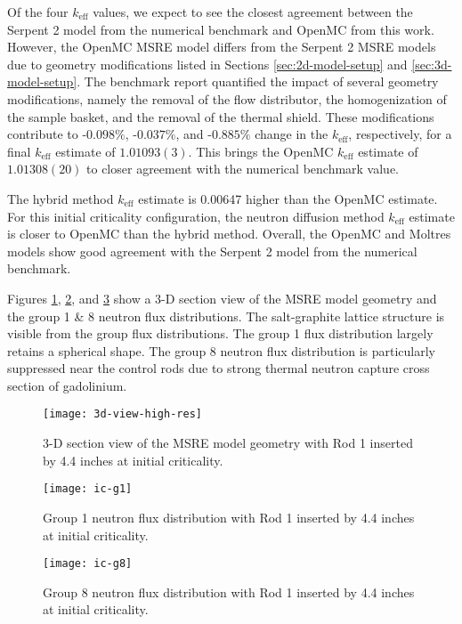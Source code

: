 Of the four $k_\text{eff}$ values, we expect to see the closest agreement between the Serpent 2
model from the numerical benchmark and OpenMC from this work. However, the OpenMC \gls{MSRE} model
differs from the Serpent 2 \gls{MSRE} models due to geometry modifications listed in Sections
\ref{sec:2d-model-setup} and \ref{sec:3d-model-setup}. The benchmark report quantified the impact
of several geometry modifications, namely the removal of the flow distributor, the homogenization
of the sample basket, and the removal of the thermal shield. These modifications contribute to
-$0.098\%$, -$0.037\%$, and -$0.885\%$ change in the $k_\text{eff}$, respectively, for a final
$k_\text{eff}$ estimate of $1.01093(3)$. This brings the OpenMC $k_\text{eff}$ estimate of
$1.01308(20)$ to closer agreement with the numerical benchmark value.

The hybrid method $k_\text{eff}$ estimate is 0.00647 higher than the OpenMC estimate. For this
initial criticality configuration, the neutron diffusion method $k_\text{eff}$ estimate is closer
to OpenMC than the hybrid method. Overall, the OpenMC and Moltres models show good agreement with
the Serpent 2 model from the numerical benchmark.

Figures \ref{fig:3d-view}, \ref{fig:ic-g1}, and \ref{fig:ic-g8} show a 3-D section view of the
\gls{MSRE} model geometry and the group 1 \& 8 neutron
flux distributions. The salt-graphite lattice structure is visible from the group flux
distributions. The group 1 flux distribution largely retains a spherical shape. The group 8 neutron
flux distribution is particularly suppressed near the control rods due to strong thermal neutron
capture cross section of gadolinium.

\begin{figure}[p]
  \centering
  \texttt{[image: 3d-view-high-res]}
  \caption{3-D section view of the \gls{MSRE} model geometry with Rod 1 inserted by 4.4 inches at
  initial criticality.}
  \label{fig:3d-view}
\end{figure}

\begin{figure}[p]
  \centering
  \texttt{[image: ic-g1]}
  \caption{Group 1 neutron flux distribution with Rod 1 inserted by 4.4 inches at initial
  criticality.}
  \label{fig:ic-g1}
\end{figure}

\begin{figure}[p]
  \centering
  \texttt{[image: ic-g8]}
  \caption{Group 8 neutron flux distribution with Rod 1 inserted by 4.4 inches at initial
  criticality.}
  \label{fig:ic-g8}
\end{figure}

